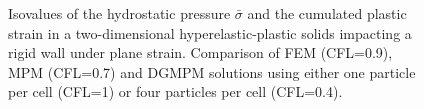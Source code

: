 \begin{figure}[ht]
  \centering
  \qquad
  \caption{Isovalues of the hydrostatic pressure $\bar{\sigma}$ and the cumulated plastic strain in a two-dimensional hyperelastic-plastic solids impacting a rigid wall under plane strain. Comparison of FEM (CFL=0.9), MPM (CFL=0.7) and DGMPM solutions using either one particle per cell (CFL=1) or four particles per cell (CFL=0.4).}
  \label{fig:PS_taylor_NL}
\end{figure}

%   

%   


%   

%   

%   

